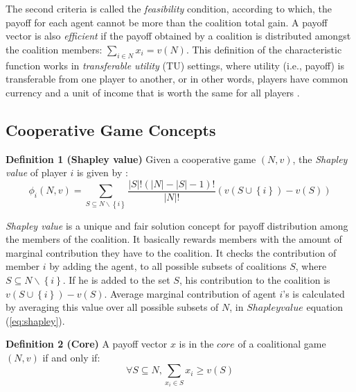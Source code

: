         The second criteria is called the \emph{feasibility} condition,
        according to which, the payoff for each agent cannot be more than
        the coalition total gain. A payoff vector is also \emph{efficient}
        if the payoff obtained by a coalition is distributed amongst the
        coalition members: $\sum_{i \in N} x_i = v(N)$. This definition of
        the characteristic function works in \emph{transferable utility}
        (TU) settings, where utility (i.e., payoff) is transferable from
        one player to another, or in other words, players have common
        currency and a unit of income that is worth the same for all players
        \cite{myerson1991game}.


        \subsection{Cooperative Game Concepts}


            {\bf Definition 1 (Shapley value)} Given a cooperative game $(N,
            v)$, the \emph{Shapley value} of player $i$ is given by \cite{shapley_value}:
            \begin{equation}\label{eq:shapley}
            \phi_i(N,v) = \sum_{S \subseteq N \backslash \left\{i\right\} }
            \frac{|S|! (|N|-|S|-1)!}{|N|!} (v(S \cup \left\{i\right\}) - v(S))
            \end{equation}

            \emph{Shapley value} is a unique and fair solution concept for
            payoff distribution among the members of the coalition. It
            basically rewards members with the amount of marginal contribution
            they have to the coalition.  It checks the contribution of member $i$ by adding the agent, to all possible subsets
            of coalitions $S$, where $S \subseteq N\backslash\left\{i\right\}$. If he is added to the set $S$, his
            contribution to the coalition is $v(S \cup \left\{i\right\}) - v(S)$. Average marginal contribution of agent $i$'s
            is calculated by averaging this value over all possible subsets of $N$, in $Shapley value$ equation (\ref{eq:shapley}).


            {\bf Definition 2 (Core)} A payoff vector $x$ is in the $core$ of
            a coalitional game $(N, v)$ if and only if:
            \begin{equation}\label{eq:core}
            \forall S \subseteq N, \sum_{x_i \in S} x_i \geq v(S)
            \end{equation}

